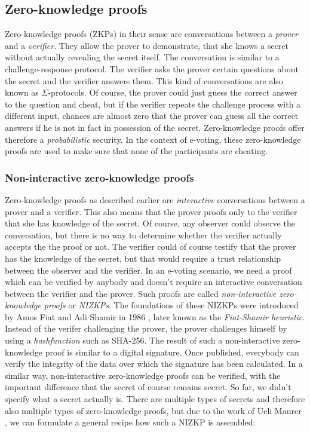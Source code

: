 \documentclass[numbers=noenddot, abstract=on, a4paper, headsepline,
footsepline, oneside, draft=off]{scrreprt}
\begin{document}
\subsection{Zero-knowledge proofs}
\label{sec:zeroknowledgeproofs}
Zero-knowledge proofs (ZKPs) in their sense are conversations between a
\textit{prover} and a \textit{verifier}. They allow the prover to demonstrate,
that she knows a secret without actually revealing the secret itself. The
conversation is similar to a challenge-response protocol. The verifier asks the
prover certain questions about the secret and the verifier answers them. This
kind of conversations are also known as $\Sigma$-protocols. Of course, the
prover could just guess the correct answer to the question and cheat, but if the
verifier repeats the challenge process with a different input, chances are
almost zero that the prover can guess all the correct answers if he is not in
fact in possession of the secret. Zero-knowledge proofs offer therefore a
\textit{probabilistic} security. In the context of e-voting, these
zero-knowledge proofs are used to make sure that none of the participants are
cheating.

\subsubsection{Non-interactive zero-knowledge proofs}
\label{sec:nizkp}
Zero-knowledge proofs as described earlier are \textit{interactive}
conversations between a prover and a verifier. This also means that the prover proofs only to
the verifier that she has knowledge of the secret. Of course, any observer could
observe the conversation, but there is no way to determine whether the verifier
actually accepts the the proof or not. The verifier could of course testify that
the prover has the knowledge of the secret, but that would require a trust
relationship between the observer and the verifier. In an e-voting scenario, we
need a proof which can be verified by anybody and doesn't require an interactive
conversation between the verifier and the prover. Such proofs are called
\textit{non-interactive zero-knowledge proofs} or \textit{NIZKPs}. The
foundations of these NIZKPs were introduced by Amos Fiat and Adi Shamir in 1986
\cite{FS87}, later known as the \textit{Fiat-Shamir heuristic}. Instead of the
verifer challenging the prover, the prover challenges himself by using a
\emph{hashfunction} such as SHA-256. The result of such a non-interactive
zero-knowledge proof is similar to a digital signature. Once published,
everybody can verify the integrity of the data over which the signature has been
calculated. In a similar way, non-interactive zero-knowledge proofs can be
verified, with the important difference that the secret of course remains
secret. So far, we didn't specify what a secret actually is. There are multiple
types of secrets and therefore also multiple types of zero-knowledge proofs, but
due to the work of Ueli Maurer \cite{Maurer09}, we can formulate a general
recipe how such a NIZKP is assembled:
\end{document}
